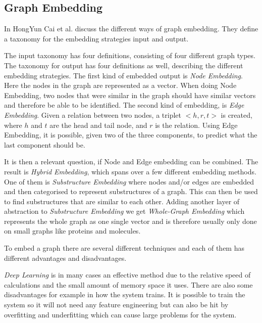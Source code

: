 \subsection{Graph Embedding}
\label{Graph_embedding}
In \cite{8294302} HongYun Cai et al. discuss the different ways of graph embedding. They define a taxonomy for the embedding strategies input and output.

The input taxonomy has four definitions, consisting of four different graph types. The taxonomy for output has four definitions as well, describing the different embedding strategies. The first kind of embedded output is \textit{Node Embedding}. Here the nodes in the graph are represented as a vector. When doing Node Embedding, two nodes that were similar in the graph should have similar vectors and therefore be able to be identified\cite{8294302}. The second kind of embedding, is \textit{Edge Embedding}. Given a relation between two nodes, a triplet $<h,r,t>$ is created,  where $h$ and $t$ are the head and tail node, and $r$ is the relation. Using Edge Embedding, it is possible, given two of the three components, to predict what the last component should be\cite{8294302}.


It is then a relevant question, if Node and Edge embedding can be combined. The result is \textit{Hybrid Embedding}, which spans over a few different embedding methods. One of them is \textit{Substructure Embedding} where nodes and/or edges are embedded and then categorised to represent substructures of a graph. This can then be used to find substructures that are similar to each other\cite{8294302}.
Adding another layer of abstraction to \textit{Substructure Embedding} we get \textit{Whole-Graph Embedding} which represents the whole graph as one single vector and is therefore usually only done on small graphs like proteins and molecules\cite{8294302}.

To embed a graph there are several different techniques and each of them has different advantages and disadvantages.


\textit{Deep Learning} is in many cases an effective method due to the relative speed of calculations and the small amount of memory space it uses. There are also some disadvantages for example in how the system trains. It is possible to train the system so it will not need any feature engineering but can also be hit by overfitting and underfitting which can cause large problems for the system\cite{8294302}.

